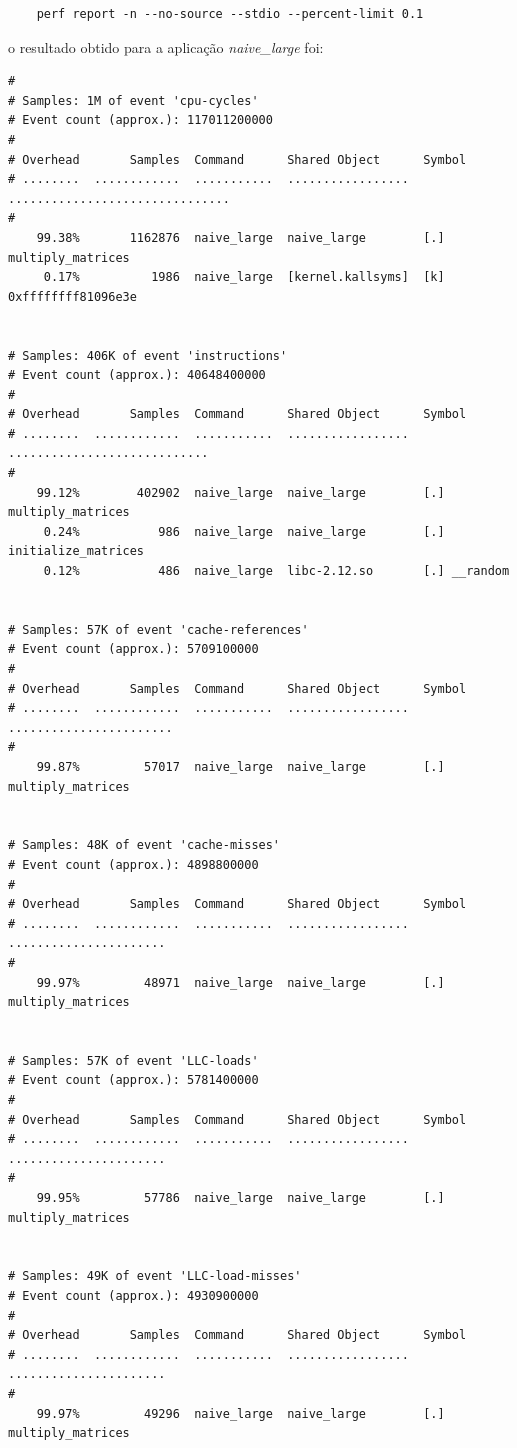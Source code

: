 \documentclass[conference,compsoc]{IEEEtran}
\begin{document}
\begin{lstlisting}
	perf report -n --no-source --stdio --percent-limit 0.1
\end{lstlisting}

o resultado obtido para a aplicação \textit{naive\_large} foi:

\begin{lstlisting}
#
# Samples: 1M of event 'cpu-cycles'
# Event count (approx.): 117011200000
#
# Overhead       Samples  Command      Shared Object      Symbol                         
# ........  ............  ...........  .................  ...............................
#
    99.38%       1162876  naive_large  naive_large        [.] multiply_matrices          
     0.17%          1986  naive_large  [kernel.kallsyms]  [k] 0xffffffff81096e3e         


# Samples: 406K of event 'instructions'
# Event count (approx.): 40648400000
#
# Overhead       Samples  Command      Shared Object      Symbol                      
# ........  ............  ...........  .................  ............................
#
    99.12%        402902  naive_large  naive_large        [.] multiply_matrices       
     0.24%           986  naive_large  naive_large        [.] initialize_matrices     
     0.12%           486  naive_large  libc-2.12.so       [.] __random                


# Samples: 57K of event 'cache-references'
# Event count (approx.): 5709100000
#
# Overhead       Samples  Command      Shared Object      Symbol                 
# ........  ............  ...........  .................  .......................
#
    99.87%         57017  naive_large  naive_large        [.] multiply_matrices  


# Samples: 48K of event 'cache-misses'
# Event count (approx.): 4898800000
#
# Overhead       Samples  Command      Shared Object      Symbol                
# ........  ............  ...........  .................  ......................
#
    99.97%         48971  naive_large  naive_large        [.] multiply_matrices 


# Samples: 57K of event 'LLC-loads'
# Event count (approx.): 5781400000
#
# Overhead       Samples  Command      Shared Object      Symbol                
# ........  ............  ...........  .................  ......................
#
    99.95%         57786  naive_large  naive_large        [.] multiply_matrices 


# Samples: 49K of event 'LLC-load-misses'
# Event count (approx.): 4930900000
#
# Overhead       Samples  Command      Shared Object      Symbol                
# ........  ............  ...........  .................  ......................
#
    99.97%         49296  naive_large  naive_large        [.] multiply_matrices 



\end{lstlisting}
\end{document}
